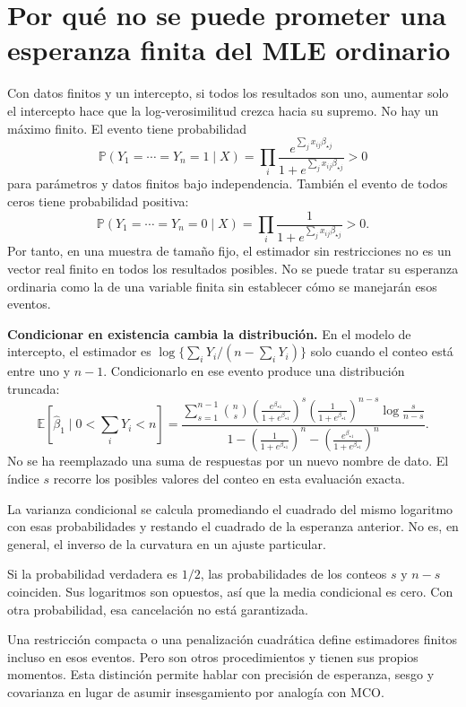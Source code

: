 \documentclass[11pt,a4paper]{article}
\newcommand{\E}{\mathbb E}
\newcommand{\Prob}{\mathbb P}
\begin{document}
\clearpage
\section{Por qué no se puede prometer una esperanza finita del MLE ordinario}\label{logit56}
Con datos finitos y un intercepto, si todos los resultados
son uno, aumentar solo el intercepto hace que la
log-verosimilitud crezca hacia su supremo.
No hay un máximo finito.
El evento tiene probabilidad
\[
\Prob(Y_1=\cdots=Y_n=1\mid X)
=\prod_i
\frac{e^{\sum_jx_{ij}\beta_{\star j}}}
{1+e^{\sum_jx_{ij}\beta_{\star j}}}>0
\]
para parámetros y datos finitos bajo independencia.
También el evento de todos ceros tiene probabilidad positiva:
\[
\Prob(Y_1=\cdots=Y_n=0\mid X)
=\prod_i\frac1{1+e^{\sum_jx_{ij}\beta_{\star j}}}>0.
\]
Por tanto, en una muestra de tamaño fijo, el estimador sin
restricciones no es un vector real finito en todos los resultados
posibles. No se puede tratar su esperanza ordinaria como
la de una variable finita sin establecer cómo se manejarán
esos eventos.

\textbf{Condicionar en existencia cambia la distribución.}
En el modelo de intercepto, el estimador es
$\log\{\sum_iY_i/(n-\sum_iY_i)\}$ solo cuando el conteo está
entre uno y $n-1$.
Condicionarlo en ese evento produce una distribución truncada:
\[
\E[\widehat\beta_1\mid 0<\sum_iY_i<n]
=
\frac{\displaystyle\sum_{s=1}^{n-1}
\binom ns
\left(\frac{e^{\beta_{\star1}}}{1+e^{\beta_{\star1}}}\right)^s
\left(\frac1{1+e^{\beta_{\star1}}}\right)^{n-s}
\log\frac{s}{n-s}}
{\displaystyle
1-
\left(\frac1{1+e^{\beta_{\star1}}}\right)^n
-
\left(\frac{e^{\beta_{\star1}}}{1+e^{\beta_{\star1}}}\right)^n}.
\]
No se ha reemplazado una suma de respuestas por un nuevo
nombre de dato. El índice $s$ recorre los posibles valores
del conteo en esta evaluación exacta.

La varianza condicional se calcula promediando el cuadrado
del mismo logaritmo con esas probabilidades y restando
el cuadrado de la esperanza anterior.
No es, en general, el inverso de la curvatura en un ajuste particular.

\begin{ejemplo}
Si la probabilidad verdadera es $1/2$, las probabilidades
de los conteos $s$ y $n-s$ coinciden.
Sus logaritmos son opuestos, así que la media condicional es cero.
Con otra probabilidad, esa cancelación no está garantizada.
\end{ejemplo}
Una restricción compacta o una penalización cuadrática
define estimadores finitos incluso en esos eventos.
Pero son otros procedimientos y tienen sus propios momentos.
Esta distinción permite hablar con precisión de esperanza,
sesgo y covarianza en lugar de asumir insesgamiento por analogía con MCO.
\end{document}
